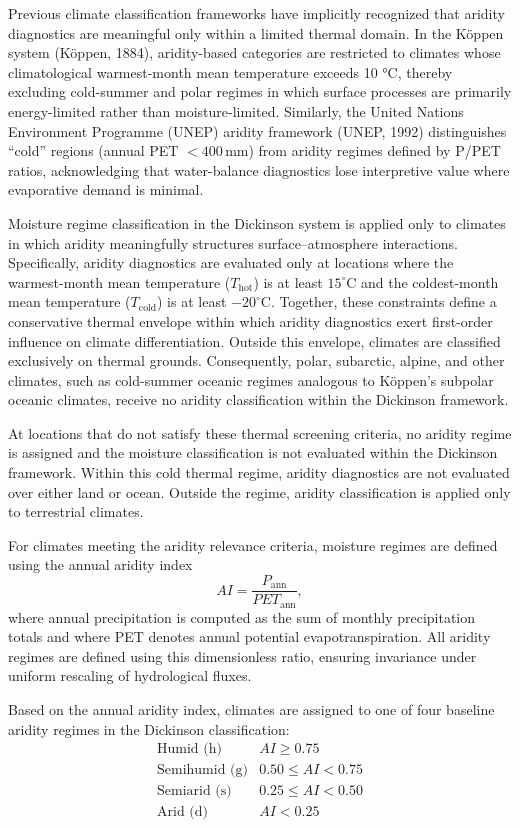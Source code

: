 \documentclass[12pt]{article}
\newcommand{\cold}{\mathrm{cold}}
\newcommand{\hot}{\mathrm{hot}}
\begin{document}
Previous climate classification frameworks have implicitly recognized that aridity diagnostics are meaningful only within a limited thermal domain. In the Köppen system (Köppen, 1884), aridity-based categories are restricted to climates whose climatological warmest-month mean temperature exceeds 10 °C, thereby excluding cold-summer and polar regimes in which surface processes are primarily energy-limited rather than moisture-limited. Similarly, the United Nations Environment Programme (UNEP) aridity framework (UNEP, 1992) distinguishes “cold” regions (annual PET $< 400\,\mathrm{mm}$) from aridity regimes defined by P/PET ratios, acknowledging that water-balance diagnostics lose interpretive value where evaporative demand is minimal.

Moisture regime classification in the Dickinson system is applied only to
climates in which aridity meaningfully structures surface–atmosphere
interactions. Specifically, aridity diagnostics are evaluated only at
locations where the warmest-month mean temperature
($T_{\hot}$) is at least $15^\circ\mathrm{C}$ and the
coldest-month mean temperature ($T_{\cold}$) is at
least $-20^\circ\mathrm{C}$. Together, these constraints define a conservative thermal envelope within which aridity diagnostics exert first-order influence on climate differentiation. Outside this envelope, climates are classified exclusively on thermal grounds.
Consequently, polar, subarctic, alpine, and other climates, such as cold-summer oceanic regimes analogous to
K\"oppen's subpolar oceanic climates, receive no aridity
classification within the Dickinson framework.

At locations that do not satisfy these thermal screening criteria, no
aridity regime is assigned and the moisture classification is not evaluated within the Dickinson framework.
Within this cold thermal regime, aridity diagnostics are not evaluated
over either land or ocean. Outside the regime, aridity classification is
applied only to terrestrial climates.

For climates meeting the aridity relevance criteria, moisture regimes are
defined using the annual aridity index
\[
AI = \frac{P_{\text{ann}}}{PET_{\text{ann}}},
\]
where annual precipitation is computed as the sum of monthly precipitation
totals and where PET denotes annual potential evapotranspiration. All aridity regimes are defined using this dimensionless ratio, ensuring invariance under uniform rescaling of hydrological fluxes.

Based on the annual aridity index, climates are assigned to one of four
baseline aridity regimes in the Dickinson classification:
\[
\begin{array}{ll}
\text{Humid (h)}        & AI \ge 0.75 \\
\text{Semihumid (g)}    & 0.50 \le AI < 0.75 \\
\text{Semiarid (s)}     & 0.25 \le AI < 0.50 \\
\text{Arid (d)}  & AI < 0.25
\end{array}
\]
\end{document}
